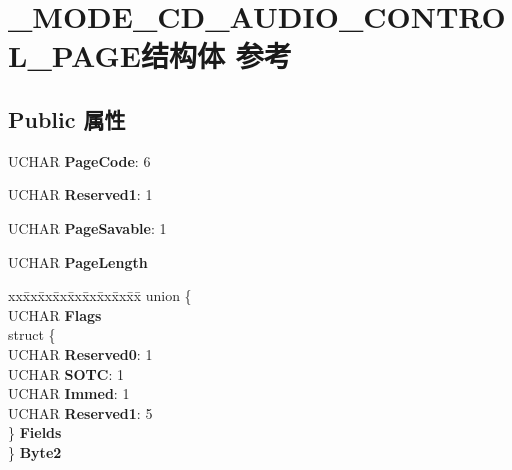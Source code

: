 \hypertarget{struct___m_o_d_e___c_d___a_u_d_i_o___c_o_n_t_r_o_l___p_a_g_e}{}\section{\+\_\+\+M\+O\+D\+E\+\_\+\+C\+D\+\_\+\+A\+U\+D\+I\+O\+\_\+\+C\+O\+N\+T\+R\+O\+L\+\_\+\+P\+A\+G\+E结构体 参考}
\label{struct___m_o_d_e___c_d___a_u_d_i_o___c_o_n_t_r_o_l___p_a_g_e}
\subsection*{Public 属性}
\begin{DoxyCompactItemize}
\item 
\mbox{\label{struct___m_o_d_e___c_d___a_u_d_i_o___c_o_n_t_r_o_l___p_a_g_e_add89d9778077f6e0d228fa5ba4bec579}} 
U\+C\+H\+AR {\bfseries Page\+Code}\+: 6
\item 
\mbox{\label{struct___m_o_d_e___c_d___a_u_d_i_o___c_o_n_t_r_o_l___p_a_g_e_a5629a134db034b26c3ab7c91e52dc2e2}} 
U\+C\+H\+AR {\bfseries Reserved1}\+: 1
\item 
\mbox{\label{struct___m_o_d_e___c_d___a_u_d_i_o___c_o_n_t_r_o_l___p_a_g_e_a560c77e150611b80b6ffffdd86af82d9}} 
U\+C\+H\+AR {\bfseries Page\+Savable}\+: 1
\item 
\mbox{\label{struct___m_o_d_e___c_d___a_u_d_i_o___c_o_n_t_r_o_l___p_a_g_e_a9f402eb38d27c2bb6368dc18646503b5}} 
U\+C\+H\+AR {\bfseries Page\+Length}
\item 
\mbox{\label{struct___m_o_d_e___c_d___a_u_d_i_o___c_o_n_t_r_o_l___p_a_g_e_a193704185cccfc28e1cd36098eee670f}} 
\begin{tabbing}
xx\=xx\=xx\=xx\=xx\=xx\=xx\=xx\=xx\=\kill
union \{\\
\>UCHAR {\bfseries Flags}\\
\>struct \{\\
\>\>UCHAR {\bfseries Reserved0}: 1\\
\>\>UCHAR {\bfseries SOTC}: 1\\
\>\>UCHAR {\bfseries Immed}: 1\\
\>\>UCHAR {\bfseries Reserved1}: 5\\
\>\} {\bfseries Fields}\\
\} {\bfseries Byte2}\\


\end{tabbing}
\end{DoxyCompactItemize}
